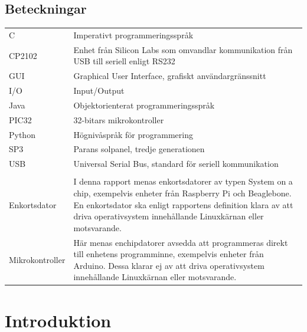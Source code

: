 \documentclass{article}
\begin{document}

    \newpage 
    \subsection*{Beteckningar} %
    \label{sub:beteckningar}
        \begin{tabularx}{\textwidth}{@{}lX}
            C & Imperativt programmeringsspråk \\
            CP2102 & Enhet från Silicon Labs som omvandlar kommunikation från
            USB till seriell enligt RS232\\
            GUI & Graphical User Interface, grafiskt användargränssnitt \\
            I/O & Input/Output \\
            Java & Objektorienterat programmeringsspråk \\
            PIC32 & 32-bitars mikrokontroller \\
            Python & Högnivåspråk för programmering \\
            SP3 & Parans solpanel, tredje generationen \\
            USB & Universal Serial Bus, standard för seriell kommunikation \\
            \\
            Enkortsdator & I denna rapport menas enkortsdatorer av typen System
            on a chip, exempelvis enheter från Raspberry Pi och Beagle\-bone. 
            En enkortsdator ska enligt rapportens definition klara av att driva 
            operativsystem innehållande Linuxkärnan eller mot\-svarande. \\
            Mikrokontroller & Här menas enchipdatorer avsedda att programmeras 
            direkt till enhetens programminne, exempelvis enheter från 
            \hbox{Arduino}. Dessa klarar ej av att driva operativsystem 
            innehållande Linux\-kärnan eller motsvarande.\\
            

        \end{tabularx}
    \newpage

    \tableofcontents
    \listoffigures

    \newpage

    \setcounter{page}{1}

    \section{Introduktion} %
    \label{sec:introduktion}
\end{document}

